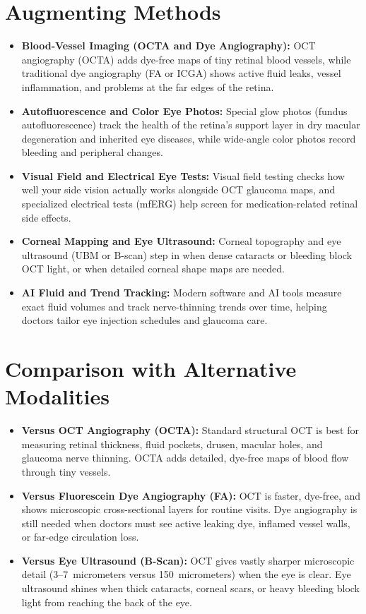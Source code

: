 \section{Augmenting Methods}
\begin{itemize}
\item \textbf{Blood-Vessel Imaging (OCTA and Dye Angiography):} OCT angiography (OCTA) adds dye-free maps of tiny retinal blood vessels, while traditional dye angiography (FA or ICGA) shows active fluid leaks, vessel inflammation, and problems at the far edges of the retina.
\item \textbf{Autofluorescence and Color Eye Photos:} Special glow photos (fundus autofluorescence) track the health of the retina's support layer in dry macular degeneration and inherited eye diseases, while wide-angle color photos record bleeding and peripheral changes.
\item \textbf{Visual Field and Electrical Eye Tests:} Visual field testing checks how well your side vision actually works alongside OCT glaucoma maps, and specialized electrical tests (mfERG) help screen for medication-related retinal side effects.
\item \textbf{Corneal Mapping and Eye Ultrasound:} Corneal topography and eye ultrasound (UBM or B-scan) step in when dense cataracts or bleeding block OCT light, or when detailed corneal shape maps are needed.
\item \textbf{AI Fluid and Trend Tracking:} Modern software and AI tools measure exact fluid volumes and track nerve-thinning trends over time, helping doctors tailor eye injection schedules and glaucoma care.
\end{itemize}

\section{Comparison with Alternative Modalities}
\begin{itemize}
\item \textbf{Versus OCT Angiography (OCTA):} Standard structural OCT is best for measuring retinal thickness, fluid pockets, drusen, macular holes, and glaucoma nerve thinning. OCTA adds detailed, dye-free maps of blood flow through tiny vessels.
\item \textbf{Versus Fluorescein Dye Angiography (FA):} OCT is faster, dye-free, and shows microscopic cross-sectional layers for routine visits. Dye angiography is still needed when doctors must see active leaking dye, inflamed vessel walls, or far-edge circulation loss.
\item \textbf{Versus Eye Ultrasound (B-Scan):} OCT gives vastly sharper microscopic detail (3--7~micrometers versus 150~micrometers) when the eye is clear. Eye ultrasound shines when thick cataracts, corneal scars, or heavy bleeding block light from reaching the back of the eye.
\end{itemize}


